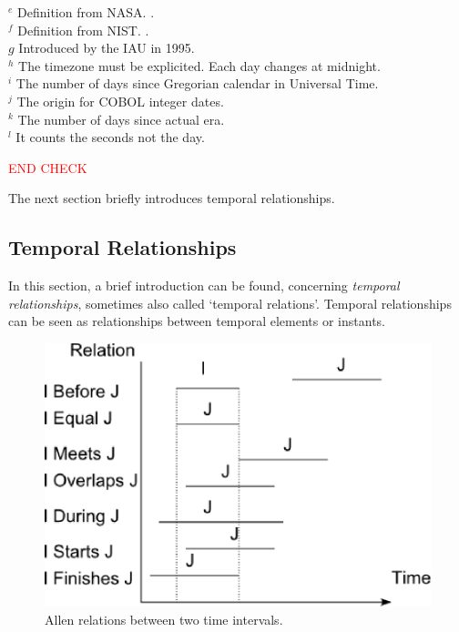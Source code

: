 \begin{table}
$^e$ Definition from NASA. \cite{Sch}. \\
$^f$ Definition from NIST. \cite{Nis}. \\
$g$ Introduced by the IAU in 1995. \\
$^h$ The timezone must be explicited. Each day changes at midnight. \\
$^i$ The number of days since Gregorian calendar in Universal Time. \\
$^j$ The origin for COBOL integer dates. \\
$^k$  The number of days since actual era. \\
$^l$  It counts the seconds not the day. \\
\end{table}

\textcolor{red}{END CHECK}

The next section briefly introduces temporal relationships.

\subsection{Temporal Relationships}
In this section, a brief introduction can be found, concerning \emph{temporal relationships}, sometimes also called `temporal relations'\cite{Billiet:Pons:Matthe:DeTre:Pons:2011:BipolarFuzzy}. Temporal relationships can be seen as relationships between temporal elements or instants.

\def\JPicScale{0.5}
\begin{figure}[h]
\centering
\includegraphics[scale=0.5]{graphs/allen.eps}
\caption{Allen relations between two time intervals.}
\label{fig:allen}
\end{figure}

